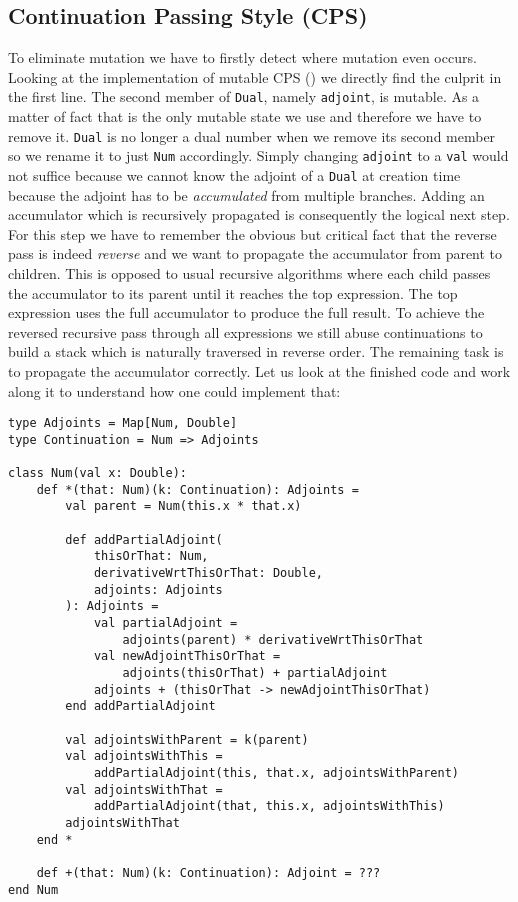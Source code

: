 \subsection{Continuation Passing Style (CPS)} \label{sec:functionalCps}

To eliminate mutation we have to firstly detect where mutation even occurs. Looking at the implementation of mutable CPS () we directly find the culprit in the first line. The second member of \lstinline{Dual}, namely \lstinline{adjoint}, is mutable. As a matter of fact that is the only mutable state we use and therefore we have to remove it. \lstinline{Dual} is no longer a dual number when we remove its second member so we rename it to just \lstinline{Num} accordingly. Simply changing \lstinline{adjoint} to a \lstinline{val} would not suffice because we cannot know the adjoint of a \lstinline{Dual} at creation time because the adjoint has to be \emph{accumulated} from multiple branches. Adding an accumulator which is recursively propagated is consequently the logical next step. For this step we have to remember the obvious but critical fact that the reverse pass is indeed \emph{reverse} and we want to propagate the accumulator from parent to children. This is opposed to usual recursive algorithms where each child passes the accumulator to its parent until it reaches the top expression. The top expression uses the full accumulator to produce the full result. To achieve the reversed recursive pass through all expressions we still abuse continuations to build a stack which is naturally traversed in reverse order. The remaining task is to propagate the accumulator correctly. Let us look at the finished code and work along it to understand how one could implement that:
\begin{lstlisting}
type Adjoints = Map[Num, Double]
type Continuation = Num => Adjoints

class Num(val x: Double):
    def *(that: Num)(k: Continuation): Adjoints =
        val parent = Num(this.x * that.x)

        def addPartialAdjoint(
            thisOrThat: Num, 
            derivativeWrtThisOrThat: Double, 
            adjoints: Adjoints
        ): Adjoints =
            val partialAdjoint = 
                adjoints(parent) * derivativeWrtThisOrThat
            val newAdjointThisOrThat = 
                adjoints(thisOrThat) + partialAdjoint
            adjoints + (thisOrThat -> newAdjointThisOrThat)
        end addPartialAdjoint

        val adjointsWithParent = k(parent)
        val adjointsWithThis = 
            addPartialAdjoint(this, that.x, adjointsWithParent)
        val adjointsWithThat = 
            addPartialAdjoint(that, this.x, adjointsWithThis)
        adjointsWithThat
    end *

    def +(that: Num)(k: Continuation): Adjoint = ???
end Num
\end{lstlisting}
